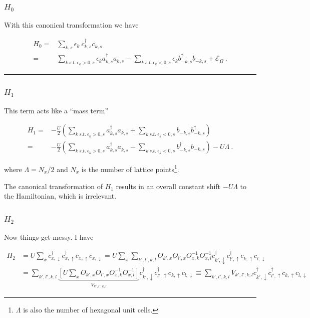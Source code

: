 \documentclass[
  letterpaper,
  DIV=11,
  numbers=noendperiod]{scrartcl}
\begin{document}
\subsubsection{\texorpdfstring{\(H_0\)}{H\_0}}\label{h_0}

With this canonical transformation we have

\begin{align}
H_0=&\sum_{k,s}\epsilon_{k}\ c^{\dagger}_{k,s}c^{}_{k,s}\\
=&\sum_{k\ s.t.\ \epsilon_k>0,s}\epsilon_{k}a^{\dagger}_{k,s}a^{}_{k,s}-\sum_{k\ s.t.\ \epsilon_k<0,s}\epsilon_{k}b^{\dagger}_{-k,s}b^{}_{-k,s}+\mathcal{E}_{\Omega}\ .
\end{align}

\begin{center}\rule{0.5\linewidth}{0.5pt}\end{center}

\subsubsection{\texorpdfstring{\(H_1\)}{H\_1}}\label{h_1}

This term acts like a ``mass term''

\begin{align}
H_1=&-\frac{U}{2}\left(\sum_{k\ s.t.\ \epsilon_k>0,s}a^{\dagger}_{k,s}a^{}_{k,s}+\sum_{k\ s.t.\ \epsilon_k<0,s}b^{}_{-k,s}b^{\dagger}_{-k,s}\right)\\
=&-\frac{U}{2}\left(\sum_{k\ s.t.\ \epsilon_k>0,s}a^{\dagger}_{k,s}a^{}_{k,s}-\sum_{k\ s.t.\ \epsilon_k<0,s}b^{\dagger}_{-k,s}b^{}_{-k,s}\right)-U\Lambda\ .
\end{align}

where \(\Lambda=N_x/2\) and \(N_x\) is the number of lattice
points\footnote{\(\Lambda\) is also the number of hexagonal unit cells.}.

The canonical transformation of \(H_1\) results in an overall constant
shift \(-U\Lambda\) to the Hamiltonian, which is irrelevant.

\subsubsection{\texorpdfstring{\(H_2\)}{H\_2}}\label{h_2}

Now things get messy. I have

\begin{align}
H_2&=U\sum_xc^\dagger_{x,\downarrow}c^\dagger_{x,\uparrow}c^{}_{x,\uparrow}c^{}_{x,\downarrow}
=U\sum_x\sum_{k',l',k,l}O^{}_{k',x}O^{}_{l',x}O^{-1}_{x,k}O^{-1}_{x,l}c^\dagger_{k',\downarrow}c^\dagger_{l',\uparrow}c^{}_{k,\uparrow}c^{}_{l,\downarrow}\\
&=\sum_{k',l',k,l}\underbrace{\left[U\sum_xO^{}_{k',x}O^{}_{l',x}O^{-1}_{x,k}O^{-1}_{x,l}\right]}_{V_{k',l';k,l}}c^\dagger_{k',\downarrow}c^\dagger_{l',\uparrow}c^{}_{k,\uparrow}c^{}_{l,\downarrow}
\equiv\sum_{k',l',k,l}V_{k',l';k,l}c^\dagger_{k',\downarrow}c^\dagger_{l',\uparrow}c^{}_{k,\uparrow}c^{}_{l,\downarrow}
\end{align}
\end{document}
